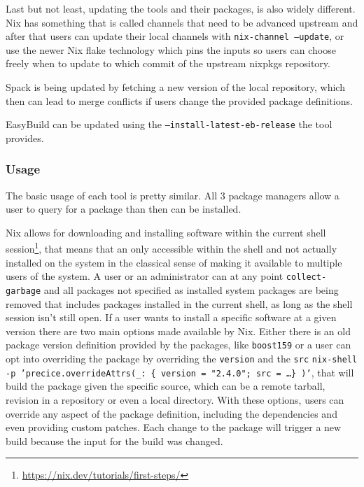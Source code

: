 \documentclass[conference,final,a4paper]{IEEEtran}
\begin{document}
Last but not least, updating the tools and their packages, is also widely different.
Nix has something that is called channels that need to be advanced upstream and after that users can update their local channels with \texttt{nix-channel --update}, or use the newer Nix flake technology which pins the inputs so users can choose freely when to update to which commit of the upstream nixpkgs repository.

Spack is being updated by fetching a new version of the local repository, which then can lead to merge conflicts if users change the provided package definitions.

EasyBuild can be updated using the \texttt{--install-latest-eb-release} the tool provides.\\

\subsubsection{Usage}

The basic usage of each tool is pretty similar.
All 3 package managers allow a user to query for a package than then can be installed.

Nix allows for downloading and installing software within the current shell session\footnote{\url{https://nix.dev/tutorials/first-steps/}}, that means that an only accessible within the shell and not actually installed on the system in the classical sense of making it available to multiple users of the system.
A user or an administrator can at any point \texttt{collect-garbage} and all packages not specified as installed system packages are being removed that includes packages installed in the current shell, as long as the shell session isn't still open.
If a user wants to install a specific software at a given version there are two main options made available by Nix.
Either there is an old package version definition provided by the packages, like \texttt{boost159} or a user can opt into overriding the package by overriding the \texttt{version} and the \texttt{src} \texttt{nix-shell -p 'precice.overrideAttrs(\_: \{ version = "2.4.0"; src = \ldots \} )'}, that will build the package given the specific source, which can be a remote tarball, revision in a repository or even a local directory.
With these options, users can override any aspect of the package definition, including the dependencies and even providing custom patches.
Each change to the package will trigger a new build because the input for the build was changed.
\end{document}
